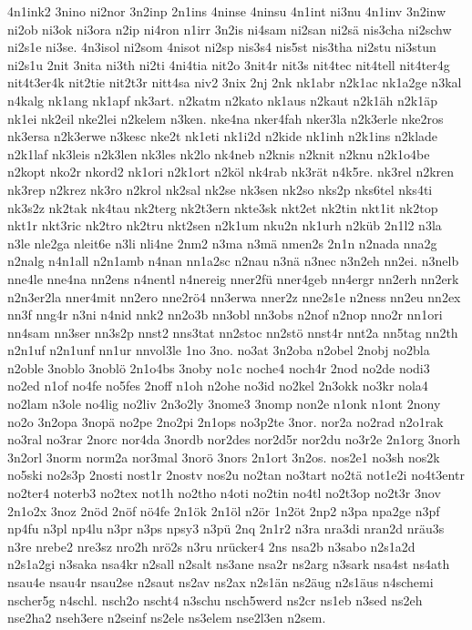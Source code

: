 {4n1ink2
3nino
ni2nor
3n2inp
2n1ins
4ninse
4ninsu
4n1int
ni3nu
4n1inv
3n2inw
ni2ob
ni3ok
ni3ora
n2ip
ni4ron
n1irr
3n2is
ni4sam
ni2san
ni2sä
nis3cha
ni2schw
ni2s1e
ni3se.
4n3isol
ni2som
4nisot
ni2sp
nis3s4
nis5st
nis3tha
ni2stu
ni3stun
ni2s1u
2nit
3nita
ni3th
ni2ti
4ni4tia
nit2o
3nit4r
nit3s
nit4tec
nit4tell
nit4ter4g
nit4t3er4k
nit2tie
nit2t3r
nitt4sa
niv2
3nix
2nj
2nk
nk1abr
n2k1ac
nk1a2ge
n3kal
n4kalg
nk1ang
nk1apf
nk3art.
n2katm
n2kato
nk1aus
n2kaut
n2k1äh
n2k1äp
nk1ei
nk2eil
nke2lei
n2kelem
n3ken.
nke4na
nker4fah
nker3la
n2k3erle
nke2ros
nk3ersa
n2k3erwe
n3kesc
nke2t
nk1eti
nk1i2d
n2kide
nk1inh
n2k1ins
n2klade
n2k1laf
nk3leis
n2k3len
nk3les
nk2lo
nk4neb
n2knis
n2knit
n2knu
n2k1o4be
n2kopt
nko2r
nkord2
nk1ori
n2k1ort
n2köl
nk4rab
nk3rät
n4k5re.
nk3rel
n2kren
nk3rep
n2krez
nk3ro
n2krol
nk2sal
nk2se
nk3sen
nk2so
nks2p
nks6tel
nks4ti
nk3s2z
nk2tak
nk4tau
nk2terg
nk2t3ern
nkte3sk
nkt2et
nk2tin
nkt1it
nk2top
nkt1r
nkt3ric
nk2tro
nk2tru
nkt2sen
n2k1um
nku2n
nk1urh
n2küb
2n1l2
n3la
n3le
nle2ga
nleit6e
n3li
nli4ne
2nm2
n3ma
n3mä
nmen2s
2n1n
n2nada
nna2g
n2nalg
n4n1all
n2n1amb
n4nan
nn1a2sc
n2nau
n3nä
n3nec
n3n2eh
nn2ei.
n3nelb
nne4le
nne4na
nn2ens
n4nentl
n4nereig
nner2fü
nner4geb
nn4ergr
nn2erh
nn2erk
n2n3er2la
nner4mit
nn2ero
nne2rö4
nn3erwa
nner2z
nne2s1e
n2ness
nn2eu
nn2ex
nn3f
nng4r
n3ni
n4nid
nnk2
nn2o3b
nn3obl
nn3obs
n2nof
n2nop
nno2r
nn1ori
nn4sam
nn3ser
nn3s2p
nnst2
nns3tat
nn2stoc
nn2stö
nnst4r
nnt2a
nn5tag
nn2th
n2n1uf
n2n1unf
nn1ur
nnvol3le
1no
3no.
no3at
3n2oba
n2obel
2nobj
no2bla
n2oble
3noblo
3noblö
2n1o4bs
3noby
no1c
noche4
noch4r
2nod
no2de
nodi3
no2ed
n1of
no4fe
no5fes
2noff
n1oh
n2ohe
no3id
no2kel
2n3okk
no3kr
nola4
no2lam
n3ole
no4lig
no2liv
2n3o2ly
3nome3
3nomp
non2e
n1onk
n1ont
2nony
no2o
3n2opa
3nopä
no2pe
2no2pi
2n1ops
no3p2te
3nor.
nor2a
no2rad
n2o1rak
no3ral
no3rar
2norc
nor4da
3nordb
nor2des
nor2d5r
nor2du
no3r2e
2n1org
3norh
3n2orl
3norm
norm2a
nor3mal
3norö
3nors
2n1ort
3n2os.
nos2e1
no3sh
nos2k
no5ski
no2s3p
2nosti
nost1r
2nostv
nos2u
no2tan
no3tart
no2tä
not1e2i
no4t3entr
no2ter4
noterb3
no2tex
not1h
no2tho
n4oti
no2tin
no4tl
no2t3op
no2t3r
3nov
2n1o2x
3noz
2nöd
2nöf
nö4fe
2n1ök
2n1öl
n2ör
1n2öt
2np2
n3pa
npa2ge
n3pf
np4fu
n3pl
np4lu
n3pr
n3ps
npsy3
n3pü
2nq
2n1r2
n3ra
nra3di
nran2d
nräu3s
n3re
nrebe2
nre3sz
nro2h
nrö2s
n3ru
nrücker4
2ns
nsa2b
n3sabo
n2s1a2d
n2s1a2gi
n3saka
nsa4kr
n2sall
n2salt
ns3ane
nsa2r
ns2arg
n3sark
nsa4st
ns4ath
nsau4e
nsau4r
nsau2se
n2saut
ns2av
ns2ax
n2s1än
ns2äug
n2s1äus
n4schemi
nscher5g
n4schl.
nsch2o
nscht4
n3schu
nsch5werd
ns2cr
ns1eb
n3sed
ns2eh
nse2ha2
nseh3ere
n2seinf
ns2ele
ns3elem
nse2l3en
n2sem.
}
